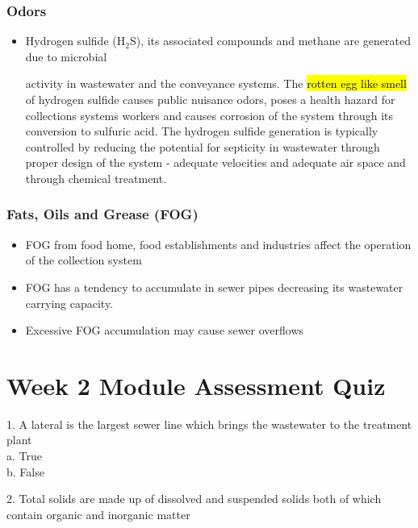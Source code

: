 \subsection{Odors}
\begin{itemize}
\item Hydrogen sulfide (H$_2$S), its associated compounds and methane are generated due to microbial

 activity in wastewater and the conveyance systems.  The \hl{rotten egg like smell} of hydrogen sulfide causes public nuisance odors, poses a health hazard for collections systems workers and causes corrosion of the system through its conversion to sulfuric acid.  The hydrogen sulfide generation is typically controlled by reducing the potential for septicity in wastewater through proper design of the system -  adequate velocities and adequate air space and through chemical treatment.
 \end{itemize}

\subsection{Fats, Oils and Grease (FOG)}
\begin{itemize}
\item FOG from food home, food establishments and industries affect the operation of the collection system
\item FOG has a tendency to accumulate in sewer pipes decreasing its wastewater carrying capacity.
\item Excessive FOG accumulation may cause sewer overflows
 \end{itemize}
 
\chapter{Week 2 Module Assessment Quiz}

1. A lateral is the largest sewer line which brings the wastewater to the treatment plant\\

a. True \\
b. False \\
\vspace{0.5cm}

2. Total solids are made up of dissolved and suspended solids both of which contain organic and inorganic matter\\

